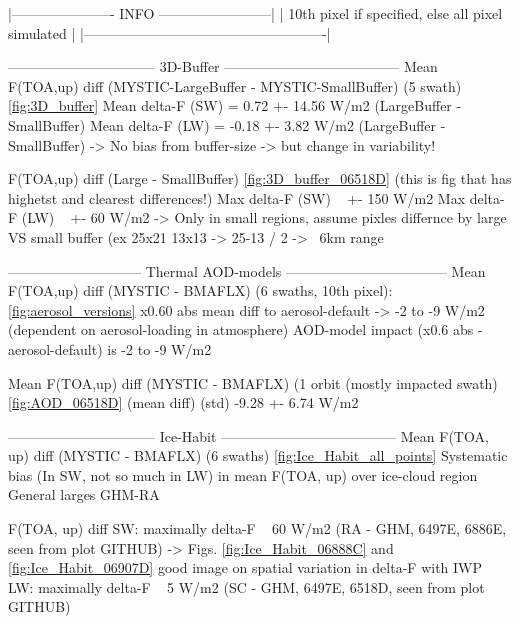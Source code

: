 

|---------------------- INFO ------------------------|
| 10th pixel if specified, else all pixel simulated  |
|----------------------------------------------------|




-------------------------------- 3D-Buffer --------------------------------------
Mean F(TOA,up) diff (MYSTIC-LargeBuffer - MYSTIC-SmallBuffer) (5 swath)
    \ref{fig:3D_buffer}
    Mean delta-F (SW)   =    0.72 +- 14.56 W/m2       (LargeBuffer - SmallBuffer)
    Mean delta-F (LW)   =   -0.18 +-  3.82 W/m2       (LargeBuffer - SmallBuffer)
        -> No bias from buffer-size -> but change in variability!

F(TOA,up) diff (Large - SmallBuffer)
    \ref{fig:3D_buffer_06518D} (this is fig that has highetst and clearest differences!)
    Max delta-F (SW)   ~ +- 150 W/m2 
    Max delta-F (LW)   ~ +-  60 W/m2
        -> Only in small regions, assume pixles differnce by large VS small buffer (ex 25x21 13x13 -> 25-13 / 2 -> ~6km range




----------------------------- Thermal AOD-models -----------------------------------
Mean F(TOA,up) diff (MYSTIC - BMAFLX) (6 swaths, 10th pixel):
    \ref{fig:aerosol_versions}
    x0.60 abs mean diff to aerosol-default -> -2 to -9 W/m2  (dependent on aerosol-loading in atmosphere)
        AOD-model impact (x0.6 abs - aerosol-default) is -2 to -9 W/m2
    
Mean F(TOA,up) diff (MYSTIC - BMAFLX) (1 orbit (mostly impacted swath)
    \ref{fig:AOD_06518D}
    (mean diff) (std)
       -9.28 +- 6.74 W/m2  


-------------------------------- Ice-Habit --------------------------------------
Mean F(TOA, up) diff (MYSTIC - BMAFLX) (6 swaths)
    \ref{fig:Ice_Habit_all_points}
    Systematic bias (In SW, not so much in LW) in mean F(TOA, up) over ice-cloud region 
    General larges GHM-RA 

F(TOA, up) diff 
    SW: maximally delta-F ~ 60 W/m2     (RA - GHM, 6497E, 6886E, seen from plot GITHUB)
        -> Figs. \ref{fig:Ice_Habit_06888C} and \ref{fig:Ice_Habit_06907D} good image on spatial variation in delta-F with IWP
    LW: maximally delta-F ~  5 W/m2     (SC - GHM, 6497E, 6518D, seen from plot GITHUB)





    
    
    